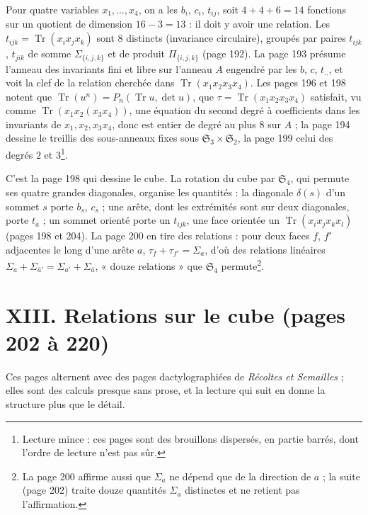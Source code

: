 \documentclass[11pt,a4paper]{article}
\begin{document}
Pour quatre variables $x_1, \ldots, x_4$, on a les $b_i$, $c_i$, $t_{ij}$, soit
$4 + 4 + 6 = 14$ fonctions sur un quotient de dimension $16 - 3 = 13$ : il doit
y avoir une relation. Les $t_{ijk} = \operatorname{Tr}(x_ix_jx_k)$ sont $8$
distincts (invariance circulaire), groupés par paires $t_{ijk}$, $t_{jik}$ de
somme $\Sigma_{\{i,j,k\}}$ et de produit $\Pi_{\{i,j,k\}}$ (page 192). La page
193 présume l'anneau des invariants fini et libre sur l'anneau $A$ engendré par
les $b$, $c$, $t_{..}$, et voit la clef de la relation cherchée dans
$\operatorname{Tr}(x_1x_2x_3x_4)$. Les pages 196 et 198 notent que
$\operatorname{Tr}(u^n) = P_n(\operatorname{Tr}u, \det u)$, que $\tau =
\operatorname{Tr}(x_1x_2x_3x_4)$ satisfait, vu comme $\operatorname{Tr}(x_1x_2(x_3x_4))$,
une équation du second degré à coefficients dans les invariants de
$x_1, x_2, x_3x_4$, donc est entier de degré au plus $8$ sur $A$ ; la page 194
dessine le treillis des sous-anneaux fixes sous $\mathfrak{S}_3 \times
\mathfrak{S}_2$, la page 199 celui des degrés $2$ et $3$\footnote{Lecture mince :
ces pages sont des brouillons dispersés, en partie barrés, dont l'ordre de
lecture n'est pas sûr.}.

C'est la page 198 qui dessine le cube. La rotation du cube par $\mathfrak{S}_4$,
qui permute ses quatre grandes diagonales, organise les quantités : la
diagonale $\delta(s)$ d'un sommet $s$ porte $b_s$, $c_s$ ; une arête, dont les
extrémités sont sur deux diagonales, porte $t_a$ ; un sommet orienté porte un
$t_{ijk}$, une face orientée un $\operatorname{Tr}(x_ix_jx_kx_l)$ (pages 198 et
204). La page 200 en tire des relations : pour deux faces $f$, $f'$
adjacentes le long d'une arête $a$, $\tau_f + \tau_{f'} = \Sigma_a$, d'où des
relations linéaires $\Sigma_a + \Sigma_{\bar a'} = \Sigma_{a'} + \Sigma_{\bar
a}$, « douze relations » que $\mathfrak{S}_4$ permute\footnote{La page 200
affirme aussi que $\Sigma_a$ ne dépend que de la direction de $a$ ; la suite
(page 202) traite douze quantités $\Sigma_a$ distinctes et ne retient pas
l'affirmation.}.

\section*{XIII. Relations sur le cube (pages 202 à 220)}

Ces pages alternent avec des pages dactylographiées de \emph{Récoltes et
Semailles} ; elles sont des calculs presque sans prose, et la lecture qui suit
en donne la structure plus que le détail.
\end{document}
